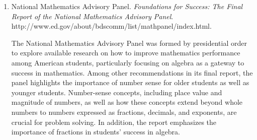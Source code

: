 \documentclass[
  10pt,
  a4paper,
  landscape,
  twoside,
  openany
]{scrbook}
\begin{document}
{{\begin{enumerate}
    \item National Mathematics Advisory Panel. \emph{Foundations for Success: The Final Report of the National Mathematics Advisory Panel}. http://www.ed.gov/about/bdscomm/list/mathpanel/index.html.

      The National Mathematics Advisory Panel was formed by presidential order to explore available research on how to improve mathematics performance among American students, particularly focusing on algebra as a gateway to success in mathematics. Among other recommendations in its final report, the panel highlights the importance of number sense for older students as well as younger students. Number-sense concepts, including place value and magnitude of numbers, as well as how these concepts extend beyond whole numbers to numbers expressed as fractions, decimals, and exponents, are crucial for problem solving. In addition, the report emphasizes the importance of fractions in students’ success in algebra.
  \end{enumerate}}
}
\end{document}
